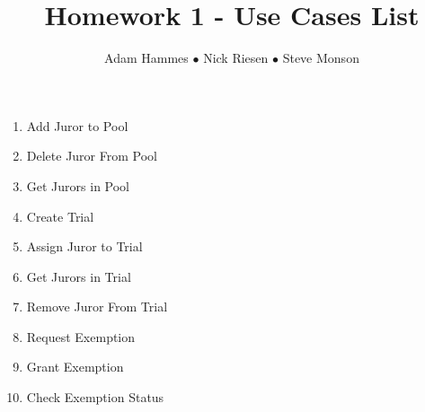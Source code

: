 \documentclass{article}
\title{Homework 1 - Use Cases List}
\author{Adam Hammes $\bullet$ Nick Riesen $\bullet$ Steve Monson}
\begin{document}
\maketitle

\begin{enumerate}
    \item Add Juror to Pool
    \item Delete Juror From Pool
    \item Get Jurors in Pool
    \item Create Trial
    \item Assign Juror to Trial
    \item Get Jurors in Trial
    \item Remove Juror From Trial
    \item Request Exemption
    \item Grant Exemption
    \item Check Exemption Status
\end{enumerate}
\end{document}
